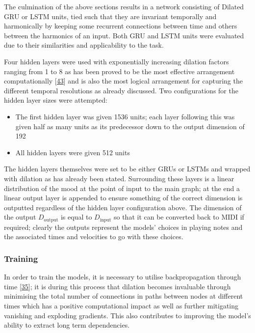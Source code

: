 \documentclass[12pt,]{article}
\providecommand{\tightlist}{%
  \setlength{\itemsep}{0pt}\setlength{\parskip}{0pt}}
\begin{document}
The culmination of the above sections results in a network consisting of
Dilated GRU or LSTM units, tied such that they are invariant temporally
and harmonically by keeping some recurrent connections between time and
others between the harmonics of an input. Both GRU and LSTM units were
evaluated due to their similarities and applicability to the task.

Four hidden layers were used with exponentially increasing dilation
factors ranging from 1 to 8 as has been proved to be the most effective
arrangement computationally
{[}\protect\hyperlink{ref-chang2017dilated}{43}{]} and is also the most
logical arrangement for capturing the different temporal resolutions as
already discussed. Two configurations for the hidden layer sizes were
attempted:

\begin{itemize}
\tightlist
\item
  The first hidden layer was given 1536 units; each layer following this
  was given half as many units as its predecessor down to the output
  dimension of 192
\item
  All hidden layers were given 512 units
\end{itemize}

The hidden layers themselves were set to be either GRUs or LSTMs and
wrapped with dilation as has already been stated. Surrounding these
layers is a linear distribution of the mood at the point of input to the
main graph; at the end a linear output layer is appended to ensure
something of the correct dimension is outputted regardless of the hidden
layer configuration above. The dimension of the output
\(D_{\text{output}}\) is equal to \(D_{\text{input}}\) so that it can be
converted back to MIDI if required; clearly the outputs represent the
models' choices in playing notes and the associated times and velocities
to go with these choices.

\hypertarget{training}{%
\subsubsection{Training}\label{training}}

In order to train the models, it is necessary to utilise backpropagation
through time
{[}\protect\hyperlink{ref-werbos1990backpropagation}{35}{]}; it is
during this process that dilation becomes invaluable through minimising
the total number of connections in paths between nodes at different
times which has a positive computational impact as well as further
mitigating vanishing and exploding gradients. This also contributes to
improving the model's ability to extract long term dependencies.
\end{document}
